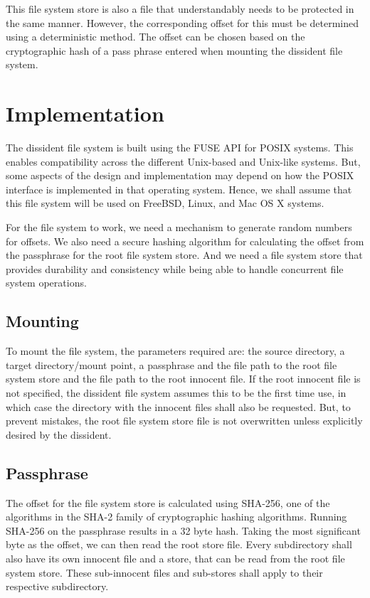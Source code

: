 \documentclass[10pt,onecolumn]{article}
\begin{document}
This file system store is also a file that understandably needs to be protected in the same manner. However, the corresponding offset for this must be determined using a deterministic method. The offset can be chosen based on the cryptographic hash of a pass phrase entered when mounting the dissident file system. 

\section{Implementation}

The dissident file system is built using the FUSE API for POSIX systems. This enables compatibility across the different Unix-based and Unix-like systems. But, some aspects of the design and implementation may depend on how the POSIX interface is implemented in that operating system. Hence, we shall assume that this file system will be used on FreeBSD, Linux, and Mac OS X systems. 

For the file system to work, we need a mechanism to generate random numbers for offsets. We also need a secure hashing algorithm for calculating the offset from the passphrase for the root file system store. And we need a file system store that provides durability and consistency while being able to handle concurrent file system operations. 

\subsection{Mounting}

To mount the file system, the parameters required are: the source directory, a target directory/mount point, a passphrase and the file path to the root file system store and the file path to the root innocent file. If the root innocent file is not specified, the dissident file system assumes this to be the first time use, in which case the directory with the innocent files shall also be requested. But, to prevent mistakes, the root file system store file is not overwritten unless explicitly desired by the dissident. 

\subsection{Passphrase}

The offset for the file system store is calculated using SHA-256, one of the algorithms in the SHA-2 family of cryptographic hashing algorithms. Running SHA-256 on the passphrase results in a 32 byte hash. Taking the most significant byte as the offset, we can then read the root store file. Every subdirectory shall also have its own innocent file and a store, that can be read from the root file system store. These sub-innocent files and sub-stores shall apply to their respective subdirectory. 
\end{document}
